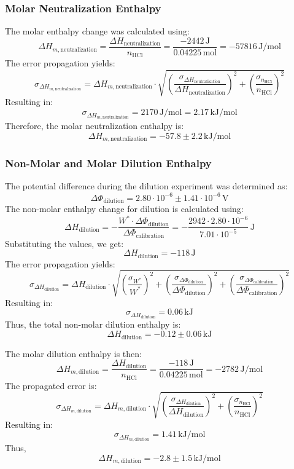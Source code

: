 \documentclass[a4paper,12pt]{article}
\begin{document}
\subsubsection{Molar Neutralization Enthalpy}
The molar enthalpy change was calculated using:
\[
\Delta H_{m, \text{neutralization}} = \frac{\Delta H_{\text{neutralization}}}{n_{\text{HCl}}} = \frac{-2442\,\si{\joule}}{0.04225\,\si{\mol}} = -57816 \, \si{\joule\per\mol}
\]
The error propagation yields:
\[
\sigma_{\Delta H_{m, \text{neutralization}}} = \Delta H_{m, \text{neutralization}} \cdot \sqrt{\left(\frac{\sigma_{\Delta H_{\text{neutralization}}}}{\Delta H_{\text{neutralization}}}\right)^2 + \left(\frac{\sigma_{n_{\text{HCl}}}}{n_{\text{HCl}}}\right)^2}
\]
Resulting in:
\[
\sigma_{\Delta H_{m, \text{neutralization}}} = 2170 \, \si{\joule\per\mol} = 2.17 \, \si{\kilo\joule\per\mol}
\]
Therefore, the molar neutralization enthalpy is:
\[
\Delta H_{m, \text{neutralization}} = -57.8 \pm 2.2 \, \si{\kilo\joule\per\mol}
\]

\subsubsection{Non-Molar and Molar Dilution Enthalpy}
The potential difference during the dilution experiment was determined as:
\[
\Delta \Phi_{\text{dilution}} = 2.80 \cdot 10^{-6} \pm 1.41 \cdot 10^{-6} \, \text{V}
\]
The non-molar enthalpy change for dilution is calculated using:
\[
\Delta H_{\text{dilution}} = -\frac{W^* \cdot \Delta \Phi_{\text{dilution}}}{\Delta \Phi_{\text{calibration}}} = -\frac{2942 \cdot 2.80 \cdot 10^{-6}}{7.01 \cdot 10^{-5}} \, \si{\joule}
\]
Substituting the values, we get:
\[
\Delta H_{\text{dilution}} = -118 \, \si{\joule}
\]
The error propagation yields:
\[
\sigma_{\Delta H_{\text{dilution}}} = \Delta H_{\text{dilution}} \cdot \sqrt{\left(\frac{\sigma_{W^*}}{W^*}\right)^2 + \left(\frac{\sigma_{\Delta \Phi_{\text{dilution}}}}{\Delta \Phi_{\text{dilution}}}\right)^2 + \left(\frac{\sigma_{\Delta \Phi_{\text{calibration}}}}{\Delta \Phi_{\text{calibration}}}\right)^2}
\]
Resulting in:
\[
\sigma_{\Delta H_{\text{dilution}}} = 0.06 \, \si{\kilo\joule}
\]
Thus, the total non-molar dilution enthalpy is:
\[
\Delta H_{\text{dilution}} = -0.12 \pm 0.06 \, \si{\kilo\joule}
\]

The molar dilution enthalpy is then:
\[
\Delta H_{m, \text{dilution}} = \frac{\Delta H_{\text{dilution}}}{n_{\text{HCl}}} = \frac{-118\,\si{\joule}}{0.04225\,\si{\mol}} = -2782 \, \si{\joule\per\mol}
\]
The propagated error is:
\[
\sigma_{\Delta H_{m, \text{dilution}}} = \Delta H_{m, \text{dilution}} \cdot \sqrt{\left(\frac{\sigma_{\Delta H_{\text{dilution}}}}{\Delta H_{\text{dilution}}}\right)^2 + \left(\frac{\sigma_{n_{\text{HCl}}}}{n_{\text{HCl}}}\right)^2}
\]
Resulting in:
\[
\sigma_{\Delta H_{m, \text{dilution}}} = 1.41 \, \si{\kilo\joule\per\mol}
\]
Thus,
\[
\Delta H_{m, \text{dilution}} = -2.8 \pm 1.5 \, \si{\kilo\joule\per\mol}
\]
\end{document}
